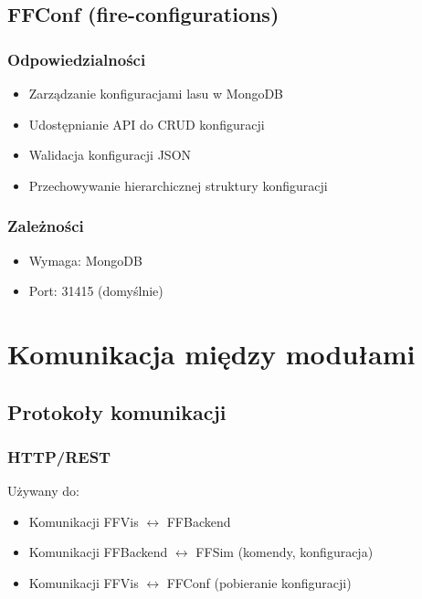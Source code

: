 \documentclass[11pt,a4paper]{article}
\begin{document}
\subsection{FFConf (fire-configurations)}

\subsubsection{Odpowiedzialności}

\begin{itemize}
    \item Zarządzanie konfiguracjami lasu w MongoDB
    \item Udostępnianie API do CRUD konfiguracji
    \item Walidacja konfiguracji JSON
    \item Przechowywanie hierarchicznej struktury konfiguracji
\end{itemize}


\subsubsection{Zależności}

\begin{itemize}
    \item Wymaga: MongoDB
    \item Port: 31415 (domyślnie)
\end{itemize}

\section{Komunikacja między modułami}

\subsection{Protokoły komunikacji}

\subsubsection{HTTP/REST}

Używany do:
\begin{itemize}
    \item Komunikacji FFVis $\leftrightarrow$ FFBackend
    \item Komunikacji FFBackend $\leftrightarrow$ FFSim (komendy, konfiguracja)
    \item Komunikacji FFVis $\leftrightarrow$ FFConf (pobieranie konfiguracji)
\end{itemize}
\end{document}
